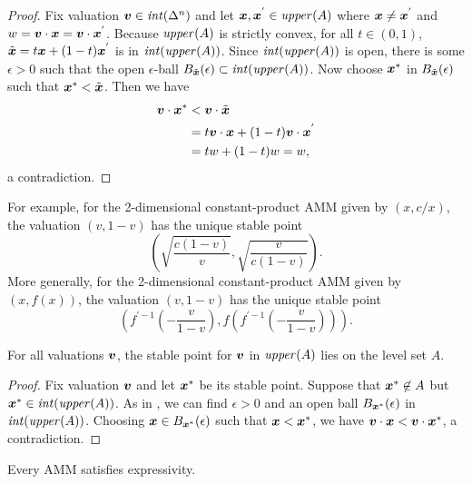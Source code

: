 \begin{proof}
  Fix valuation ${\boldsymbol v} \in \mathit{int}(\Delta^{n})$ and
  let ${\boldsymbol x},{\boldsymbol x}^{'} \in \mathit{upper}(A)$ where ${\boldsymbol x} \neq {\boldsymbol x}^{'}$
  and $w = {\boldsymbol v} \cdot {\boldsymbol x} = {\boldsymbol v} \cdot {\boldsymbol x}^{'}$.
  Because $\mathit{upper}(A)$ is strictly convex,
  for all $t \in (0,1)$,
  $\tilde{{\boldsymbol x}} = t {\boldsymbol x} + (1 - t){\boldsymbol x}^{'}$ is in $\mathit{int}(\mathit{upper}(A))$.
  Since $\mathit{int}(\mathit{upper}(A))$ is open,
  there is some $\epsilon > 0$ such that the open
  $\epsilon$-ball $B_{\tilde{{\boldsymbol x}}}(\epsilon) \subset \mathit{int}(\mathit{upper}(A))$.
  Now choose ${\boldsymbol x}^{*}$ in $B_{\tilde{{\boldsymbol x}}}(\epsilon)$
  such that ${\boldsymbol x}^{*} < \tilde{{\boldsymbol x}}$.
  Then we have
  \begin{align*}
    {\boldsymbol v} \cdot {\boldsymbol x}^{*}
    &< {\boldsymbol v} \cdot \tilde{{\boldsymbol x}}\\
    &= t {\boldsymbol v} \cdot {\boldsymbol x} + (1 - t){\boldsymbol v} \cdot {\boldsymbol x}^{'}\\
    &= t w + (1-t) w = w,
\end{align*}
  a contradiction.
\end{proof}

For example,
for the 2-dimensional constant-product AMM given by $(x,c/x)$,
the valuation $(v,1-v)$ has the unique stable point
\begin{equation*}
    \left(\sqrt{\frac{c(1-v)}{v}},\sqrt{\frac{v}{c(1-v)}}\right).
\end{equation*}
More generally,
for the 2-dimensional constant-product AMM given by $(x,f(x))$,
the valuation $(v,1-v)$ has the unique stable point
\begin{equation*}
\left(f^{\prime -1}\left(-\frac{v}{1-v}\right), f\left(f^{\prime -1}
\left(-\frac{v}{1-v}\right)\right)\right).
\end{equation*}
\begin{lemma}%
  For all valuations ${\boldsymbol v}$,
  the stable point for ${\boldsymbol v}$ in $\mathit{upper}(A)$ lies on the level set $A$.
\end{lemma}

\begin{proof}
    Fix valuation ${\boldsymbol v}$ and let ${\boldsymbol x}^{*}$ be its stable point.
    Suppose that ${\boldsymbol x}^{*} \not \in A$ but ${\boldsymbol x}^{*} \in \mathit{int}(\mathit{upper}(A))$.
    As in ,
    we can find $\epsilon > 0$ and an open ball $B_{{\boldsymbol x}^{*}}(\epsilon)$ in $\mathit{int}(\mathit{upper}(A))$.
    Choosing ${\boldsymbol x} \in B_{{\boldsymbol x}^{*}}(\epsilon)$ such that ${\boldsymbol x}< {\boldsymbol x}^{*}$,
    we have ${\boldsymbol v} \cdot {\boldsymbol x} < {\boldsymbol v} \cdot {\boldsymbol x}^{*}$,
    a contradiction.
\end{proof}

\begin{corollary}
  Every AMM satisfies expressivity.
\end{corollary}


